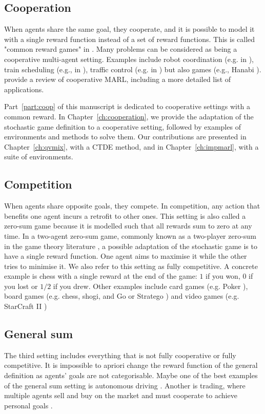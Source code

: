 \subsection{Cooperation} 
\label{sec:ch2_Cooperation}
When agents share the same goal, they cooperate, and it is possible to model it with a single reward function instead of a set of reward functions.
This is called "common reward games" in \citep{marl-book}.
Many problems can be considered as being a cooperative multi-agent setting.
Examples include robot coordination (e.g. in \citep{papoudakis2021benchmarking}), train scheduling (e.g., in \citep{mohanty2020flatland}), traffic control (e.g. in \citep{zhang2019cityflow}) but also games (e.g., Hanabi \citep{Bard_2020}).
\citet{oroojlooy2022review} provide a review of cooperative MARL, including a more detailed list of applications.

Part~\ref{part:coop} of this manuscript is dedicated to cooperative settings with a common reward.
In Chapter~\ref{ch:cooperation}, we provide the adaptation of the stochastic game definition to a cooperative setting, followed by examples of environments and methods to solve them.
Our contributions are presented in Chapter~\ref{ch:qvmix}, with a CTDE method, and in Chapter~\ref{ch:impmarl}, with a suite of environments.

\subsection{Competition} 
\label{sec:ch2_Competition}
When agents share opposite goals, they compete.
In competition, any action that benefits one agent incurs a retrofit to other ones.
This setting is also called a zero-sum game \citep{marl-book} because it is modelled such that all rewards sum to zero at any time.
In a two-agent zero-sum game, commonly known as a two-player zero-sum in the game theory literature \citep{russel2010}, a possible adaptation of the stochastic game is to have a single reward function.
One agent aims to maximise it while the other tries to minimise it.
We also refer to this setting as fully competitive.
A concrete example is chess with a single reward at the end of the game: $1$ if you won, $0$ if you lost or $1/2$ if you drew.
Other examples include card games (e.g. Poker \citep{poker}), board games (e.g. chess, shogi, and Go \citep{silver2018general} or Stratego \citep{stratego}) and video games (e.g. StarCraft II \citep{vinyals2019grandmaster})


\subsection{General sum} 
\label{sec:ch2_general_sum}
The third setting includes everything that is not fully cooperative or fully competitive.
It is impossible to apriori change the reward function of the general definition as agents' goals are not categorisable.
Maybe one of the best examples of the general sum setting is autonomous driving \citep{dinneweth2022multi}.
Another is trading, where multiple agents sell and buy on the market and must cooperate to achieve personal goals \citep{SHAVANDI2022118124}.

